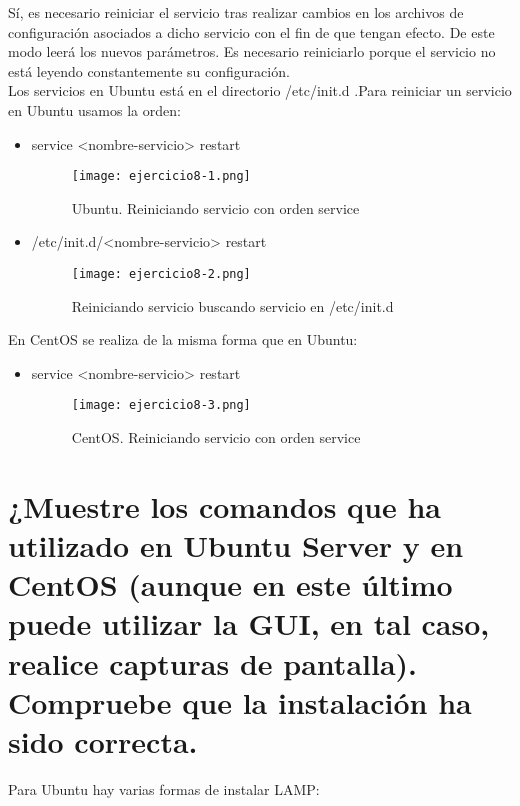 	Sí, es necesario reiniciar el servicio tras realizar cambios en los archivos de configuración asociados a dicho servicio con el fin de que tengan efecto. De este modo leerá los nuevos parámetros. Es necesario reiniciarlo porque el servicio no está leyendo constantemente su configuración.
	\\
	
	Los servicios en Ubuntu está en el directorio /etc/init.d .Para reiniciar un servicio en Ubuntu usamos la orden\cite{ejercicio8-1}:
	\begin{itemize}
		\item service <nombre-servicio> restart
			\begin{figure}[H]	
				\centering
				\texttt{[image: ejercicio8-1.png]} 
				\label{figura63} 
				\caption{Ubuntu. Reiniciando servicio con orden service}
			\end{figure}
		\item /etc/init.d/<nombre-servicio> restart
			\begin{figure}[H]	
				\centering
				\texttt{[image: ejercicio8-2.png]} 
				\label{figura64} 
				\caption{Reiniciando servicio buscando servicio en /etc/init.d}
			\end{figure}
	\end{itemize} 
	
	En CentOS\cite{ejercicio8-2} se realiza de la misma forma que en Ubuntu:
	\begin{itemize}
		\item service <nombre-servicio> restart
			\begin{figure}[H]	
				\centering
				\texttt{[image: ejercicio8-3.png]} 
				\label{figura65} 
				\caption{CentOS. Reiniciando servicio con orden service}
			\end{figure}
	\end{itemize} 
	
	\section{¿Muestre los comandos que ha utilizado en Ubuntu Server y en CentOS (aunque en este último puede utilizar la GUI, en tal caso, realice capturas de pantalla). Compruebe que la instalación ha sido correcta.}
	
	Para Ubuntu hay varias formas de instalar LAMP\cite{ejercicio9-1,ejercicio9-2}:
	
